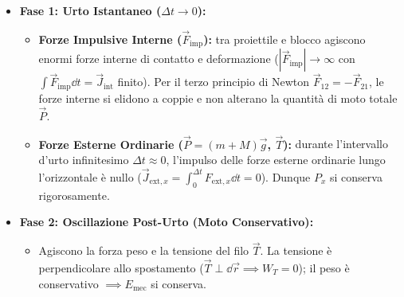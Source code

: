 \begin{center}
\end{center}

\begin{tcolorbox}[enhanced, breakable, colback=forestgreen!5!white, colframe=forestgreen!80!black,
    title={\textbf{Analisi delle Forze in Gioco nelle Due Fasi del Pendolo Balistico}}, fonttitle=\bfseries\sffamily]
\begin{itemize}
    \item \textbf{Fase 1: Urto Istantaneo ($\Delta t \to 0$):}
    \begin{itemize}
        \item \textbf{Forze Impulsive Interne ($\vec{F}_{\text{imp}}$):} tra proiettile e blocco agiscono enormi forze interne di contatto e deformazione ($|\vec{F}_{\text{imp}}| \to \infty$ con $\int \vec{F}_{\text{imp}}\dd t = \vec{J}_{\text{int}}$ finito). Per il terzo principio di Newton $\vec{F}_{12} = -\vec{F}_{21}$, le forze interne si elidono a coppie e non alterano la quantità di moto totale $\vec{P}$.
        \item \textbf{Forze Esterne Ordinarie ($\vec{P} = (m+M)\vec{g}$, $\vec{T}$):} durante l'intervallo d'urto infinitesimo $\Delta t \approx 0$, l'impulso delle forze esterne ordinarie lungo l'orizzontale è nullo ($\vec{J}_{\text{ext},x} = \int_0^{\Delta t} F_{\text{ext},x}\dd t = 0$). Dunque $P_x$ si conserva rigorosamente.
    \end{itemize}
    \item \textbf{Fase 2: Oscillazione Post-Urto (Moto Conservativo):}
    \begin{itemize}
        \item Agiscono la forza peso e la tensione del filo $\vec{T}$. La tensione è perpendicolare allo spostamento ($\vec{T}\perp\dd\vec{r} \implies W_T = 0$); il peso è conservativo $\implies E_{\text{mec}}$ si conserva.
    \end{itemize}
\end{itemize}
\end{tcolorbox}

